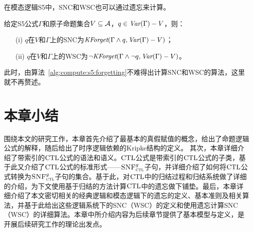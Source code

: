 在模态逻辑S5中，SNC和WSC也可以通过遗忘来计算。
\begin{theorem}\label{thm:S5:SNC}
	给定S5公式$\Gamma$和原子命题集合$V\subseteq {\cal A}$，$q\in \textit{Var}(\Gamma) -V$，则：
	\begin{itemize}
		\item[(i)]  $q$在$V$和$\Gamma$上的SNC为$\textit{KForget}(\Gamma \wedge q, \textit{Var}(\Gamma)-V)$；
		\item[(ii)] $q$在$V$和$\Gamma$上的WSC为$\neg \textit{KForget}(\Gamma \wedge \neg q, \textit{Var}(\Gamma)-V)$。
	\end{itemize}
\end{theorem}
此时，由算法~\ref{alg:compute:s5:forgetting}不难得出计算SNC和WSC的算法，这里就不再赘述。


\section{本章小结}
围绕本文的研究工作，本章首先介绍了最基本的真假赋值的概念，给出了命题逻辑公式的解释，随后给出了时序逻辑依赖的Kripke结构的定义。
其次，本章详细介绍了带索引的$\textrm{CTL}$公式的语法和语义。$\textrm{CTL}$公式是带索引的$\textrm{CTL}$公式的子类，基于此又介绍了$\textrm{CTL}$公式的标准形式——${\textsc{SNF}_{\textsc{ctl}}^g}$子句，并详细介绍了如何将$\textrm{CTL}$公式转换为${\textsc{SNF}_{\textsc{ctl}}^g}$子句的集合。基于此，对$\textrm{CTL}$中的归结过程和归结系统做了详细的介绍，为下文使用基于归结的方法计算$\textrm{CTL}$中的遗忘做下铺垫。最后，本章详细介绍了本文密切相关的经典逻辑和模态逻辑下的遗忘的定义、基本准则及相关算法，并基于此给出这些逻辑系统下的SNC（WSC）的定义和使用遗忘计算SNC（WSC）的详细算法。本章中所介绍内容为后续章节提供了基本模型与定义，是开展后续研究工作的理论出发点。

